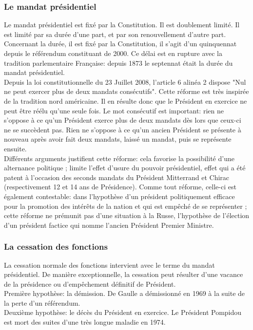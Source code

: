 \documentclass[12pt, a4paper, openany]{book}
\begin{document}
\subsubsection{Le mandat présidentiel}

Le mandat présidentiel est fixé par la Constitution. Il est doublement limité. Il est limité par sa durée d'une part, et par son renouvellement d'autre part. \\
Concernant la durée, il est fixé par la Constitution, il s'agit d'un quinquennat depuis le référendum constituant de 2000. Ce délai est en rupture avec la tradition parlementaire Française: depuis 1873 le septennat était la durée du mandat présidentiel. \\
Depuis la loi constitutionnelle du 23 Juillet 2008, l'article 6 alinéa 2 dispose "Nul ne peut exercer plus de deux mandats consécutifs". Cette réforme est très  inspirée de la tradition nord américaine. Il en résulte donc que le Président en exercice ne peut être réélu qu'une seule fois. Le mot consécutif est important: rien ne s'oppose à ce qu'un Président exerce plus de deux mandats dès lors que ceux-ci ne se succèdent pas. Rien ne s'oppose à ce qu'un ancien Président se présente  à nouveau après avoir fait deux mandats, laissé un mandat, puis se représente ensuite. \\
Différents arguments justifient cette réforme: cela favorise la possibilité d'une alternance politique ; limite l'effet d'usure du pouvoir présidentiel, effet qui a été patent à l'occasion des seconds mandats du Président Mitterrand et Chirac (respectivement 12 et 14 ans de Présidence). Comme tout réforme, celle-ci est également contestable: dans l'hypothèse d'un président politiquement efficace pour la promotion des intérêts de la nation et qui est empêché de se représenter ; cette réforme ne prémunit pas d'une situation à la Russe, l'hypothèse de l'élection d'un président factice qui nomme l'ancien Président Premier Ministre.


\subsubsection{La cessation des fonctions}

La cessation normale des fonctions intervient avec le terme du mandat présidentiel. De manière exceptionnelle, la cessation peut résulter d'une vacance de la présidence ou d'empêchement définitif de Président. \\
Première hypothèse: la démission. De Gaulle a démissionné en 1969 à la suite de la perte d'un référendum. \\
Deuxième hypothèse: le décès du Président en exercice. Le Président Pompidou est mort des suites d'une très longue maladie en 1974.
\end{document}
